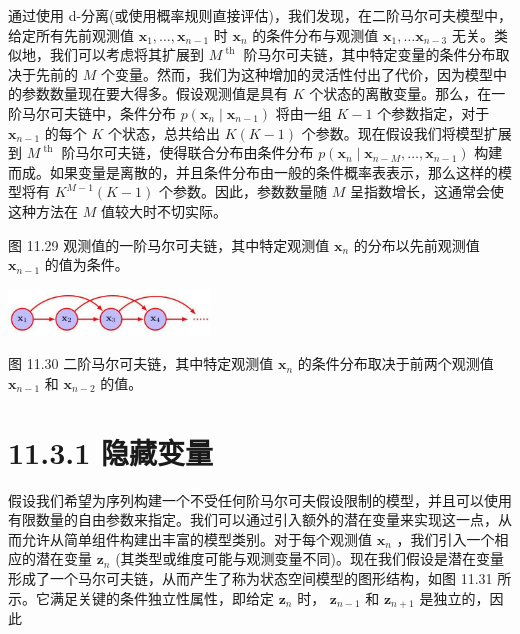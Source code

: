 \documentclass[10pt]{article}
\begin{document}
通过使用 d-分离(或使用概率规则直接评估)，我们发现，在二阶马尔可夫模型中，给定所有先前观测值 \({\mathbf{x}}_{1},\ldots ,{\mathbf{x}}_{n - 1}\) 时 \({\mathbf{x}}_{n}\) 的条件分布与观测值 \({\mathbf{x}}_{1},\ldots {\mathbf{x}}_{n - 3}\) 无关。类似地，我们可以考虑将其扩展到 \({M}^{\text{ th }}\) 阶马尔可夫链，其中特定变量的条件分布取决于先前的 \(M\) 个变量。然而，我们为这种增加的灵活性付出了代价，因为模型中的参数数量现在要大得多。假设观测值是具有 \(K\) 个状态的离散变量。那么，在一阶马尔可夫链中，条件分布 \(p\left( {{\mathbf{x}}_{n} \mid  {\mathbf{x}}_{n - 1}}\right)\) 将由一组 \(K - 1\) 个参数指定，对于 \({\mathbf{x}}_{n - 1}\) 的每个 \(K\) 个状态，总共给出 \(K\left( {K - 1}\right)\) 个参数。现在假设我们将模型扩展到 \({M}^{\text{ th }}\) 阶马尔可夫链，使得联合分布由条件分布 \(p\left( {{\mathbf{x}}_{n} \mid  {\mathbf{x}}_{n - M},\ldots ,{\mathbf{x}}_{n - 1}}\right)\) 构建而成。如果变量是离散的，并且条件分布由一般的条件概率表表示，那么这样的模型将有 \({K}^{M - 1}\left( {K - 1}\right)\) 个参数。因此，参数数量随 \(M\) 呈指数增长，这通常会使这种方法在 \(M\) 值较大时不切实际。

图 11.29 观测值的一阶马尔可夫链，其中特定观测值 \({\mathbf{x}}_{n}\) 的分布以先前观测值 \({\mathbf{x}}_{n - 1}\) 的值为条件。

\begin{center}
\includegraphics[max width=0.4\textwidth]{images/0194e279-9b28-703a-88f4-c3ac21e2010d_371_947_356_592_138_0.jpg}
\end{center}
\hspace*{3em} 

图 11.30 二阶马尔可夫链，其中特定观测值 \({\mathbf{x}}_{n}\) 的条件分布取决于前两个观测值 \({\mathbf{x}}_{n - 1}\) 和 \({\mathbf{x}}_{n - 2}\) 的值。

\section*{11.3.1 隐藏变量}

假设我们希望为序列构建一个不受任何阶马尔可夫假设限制的模型，并且可以使用有限数量的自由参数来指定。我们可以通过引入额外的潜在变量来实现这一点，从而允许从简单组件构建出丰富的模型类别。对于每个观测值 \({\mathbf{x}}_{n}\) ，我们引入一个相应的潜在变量 \({\mathbf{z}}_{n}\) (其类型或维度可能与观测变量不同)。现在我们假设是潜在变量形成了一个马尔可夫链，从而产生了称为状态空间模型的图形结构，如图 11.31 所示。它满足关键的条件独立性属性，即给定 \({\mathbf{z}}_{n}\) 时， \({\mathbf{z}}_{n - 1}\) 和 \({\mathbf{z}}_{n + 1}\) 是独立的，因此
\end{document}
